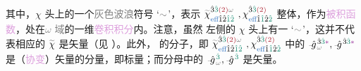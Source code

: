 其中，$\chi$ 头上的一个\textcolor{gray}{灰色波浪}符号 `$\mathcolor{gray}{\sim}$'，表示 $\textcolor{gray}{\widetilde{\textcolor{black}{\chi}}}^{ \hat{3} \textcolor{PineGreen}{\hat{3}} \textcolor{Maroon}{(2)} \mathcolor{gray}{\omega} }_{ \textcolor{NavyBlue}{\text{eff}} \hat{1} \hat{2} \textcolor{PineGreen}{\hat{1} \hat{2}} }~, {\chi}^{\hat{3} \textcolor{PineGreen}{\hat{3}} \textcolor{Maroon}{(2)} }_{\textcolor{NavyBlue}{\text{eff}} \hat{1} \textcolor{PineGreen}{\hat{1}} \hat{2} \textcolor{PineGreen}{\hat{2}} }$ 整体，作为\textcolor{Plum}{被积函数}，处在\textcolor{gray}{$\omega$ 域}的一维\textcolor{Plum}{卷积积分}内。注意，虽然  左侧的 $\chi$ 头上有一 `$\mathcolor{gray}{\sim}$'，这并不代表相应的 $\textcolor{gray}{\widetilde{\textcolor{black}{\chi}}}$ 是矢量（见 ）。此外， 的分子，即 $\textcolor{gray}{\widetilde{\textcolor{black}{\chi}}}^{ \hat{3} \textcolor{PineGreen}{\hat{3}} \textcolor{Maroon}{(2)} \mathcolor{gray}{\omega} }_{ \textcolor{NavyBlue}{\text{eff}} \hat{1} \hat{2} \textcolor{PineGreen}{\hat{1} \hat{2}} }~, {\chi}^{\hat{3} \textcolor{PineGreen}{\hat{3}} \textcolor{Maroon}{(2)} }_{\textcolor{NavyBlue}{\text{eff}} \hat{1} \textcolor{PineGreen}{\hat{1}} \hat{2} \textcolor{PineGreen}{\hat{2}} }$ 中的 $\Xint{{}^{}_{\mathcolor{gray}{-}}}{10}{\hat{g}}^{\;\! \hat{3} \textcolor{PineGreen}{\hat{3}} \textcolor{Plum}{*}}_{\;\! \mathcolor{gray}{\omega}}, \Xint{{}^{}_{\mathcolor{gray}{-}}}{10}{\hat{g}}^{\;\! \hat{3} \textcolor{PineGreen}{\hat{3}} \textcolor{Plum}{*}}_{\;\! }$ 是（\textcolor{Plum}{协变}）矢量的分量，即标量；而分母中的 $\Xint{{}^{}_{\mathcolor{gray}{-}}}{10}{\hat{g}}^{\;\! \textcolor{PineGreen}{\hat{3}}}_{\;\! \mathcolor{gray}{\omega}}, \Xint{{}^{}_{\mathcolor{gray}{-}}}{10}{\hat{g}}^{\;\! \textcolor{PineGreen}{\hat{3}}}$ 是矢量。

